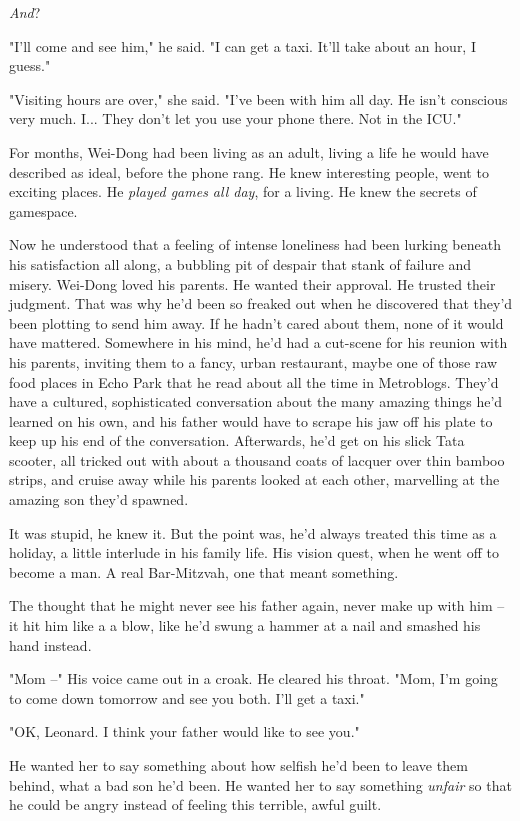 \emph{And}?

"I'll come and see him," he said. "I can get a taxi. It'll take
about an hour, I guess."

"Visiting hours are over," she said. "I've been with him all day.
He isn't conscious very much. I... They don't let you use your
phone there. Not in the ICU."

For months, Wei-Dong had been living as an adult, living a life he
would have described as ideal, before the phone rang. He knew
interesting people, went to exciting places. He
\emph{played games all day}, for a living. He knew the secrets of
gamespace.

Now he understood that a feeling of intense loneliness had been
lurking beneath his satisfaction all along, a bubbling pit of
despair that stank of failure and misery. Wei-Dong loved his
parents. He wanted their approval. He trusted their judgment. That
was why he'd been so freaked out when he discovered that they'd
been plotting to send him away. If he hadn't cared about them, none
of it would have mattered. Somewhere in his mind, he'd had a
cut-scene for his reunion with his parents, inviting them to a
fancy, urban restaurant, maybe one of those raw food places in Echo
Park that he read about all the time in Metroblogs. They'd have a
cultured, sophisticated conversation about the many amazing things
he'd learned on his own, and his father would have to scrape his
jaw off his plate to keep up his end of the conversation.
Afterwards, he'd get on his slick Tata scooter, all tricked out
with about a thousand coats of lacquer over thin bamboo strips, and
cruise away while his parents looked at each other, marvelling at
the amazing son they'd spawned.

It was stupid, he knew it. But the point was, he'd always treated
this time as a holiday, a little interlude in his family life. His
vision quest, when he went off to become a man. A real Bar-Mitzvah,
one that meant something.

The thought that he might never see his father again, never make up
with him -- it hit him like a a blow, like he'd swung a hammer at a
nail and smashed his hand instead.

"Mom --" His voice came out in a croak. He cleared his throat.
"Mom, I'm going to come down tomorrow and see you both. I'll get a
taxi."

"OK, Leonard. I think your father would like to see you."

He wanted her to say something about how selfish he'd been to leave
them behind, what a bad son he'd been. He wanted her to say
something \emph{unfair} so that he could be angry instead of
feeling this terrible, awful guilt.

